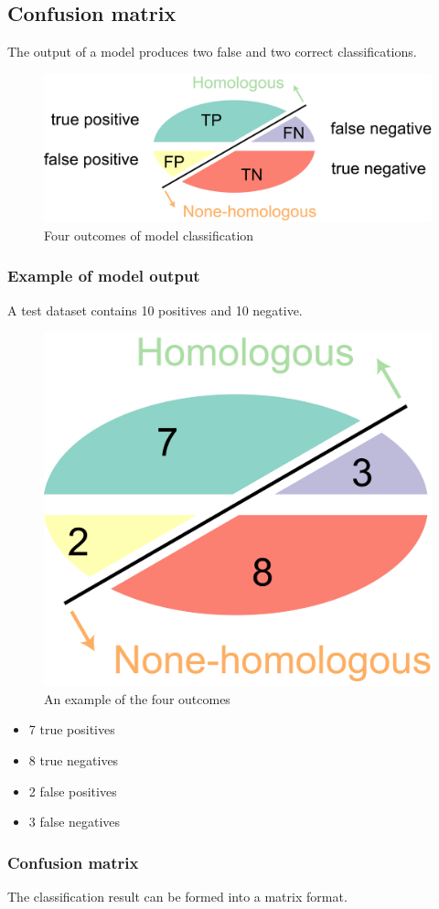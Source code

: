 %
%

%
%
\subsection{Confusion matrix}
The output of a model produces two false and two correct classifications. 

\begin{figure}[H]
  \centering
      \includegraphics[width=0.4 \textwidth]{fig07/four_outcomes.png}
  \caption{Four outcomes of model classification}
\end{figure}


%
%
\subsubsection*{Example of model output}
A test dataset contains 10 positives and 10 negative. 

\begin{figure}[H]
  \centering
      \includegraphics[width=0.2 \textwidth]{fig07/example_model_output.png}
  \caption{An example of the four outcomes}
\end{figure}

\begin{itemize}
\item 7 true positives
\item 8 true negatives
\item 2 false positives
\item 3 false negatives
\end{itemize}

%
%
\subsubsection*{Confusion matrix}
The classification result can be formed into a matrix format.

